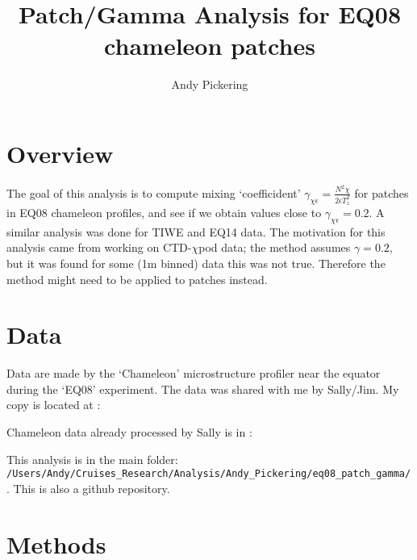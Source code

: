 \documentclass[11pt]{article}
\title{Patch/Gamma Analysis for EQ08 chameleon patches}
\author{Andy Pickering}
\begin{document}
\maketitle

\tableofcontents
\newpage

\section{Overview}

The goal of this analysis is to compute mixing `coefficident' $\gamma_{\chi\epsilon}=\frac{N^2 \chi}{2\epsilon T_{z}^{2}} $ for patches in EQ08 chameleon profiles, and see if we obtain values close to $\gamma_{\chi\epsilon}=0.2$. A similar analysis was done for TIWE and EQ14 data. The motivation for this analysis came from working on CTD-$\chi$pod data; the method assumes $\gamma=0.2$, but it was found for some (1m binned) data this was not true. Therefore the method might need to be applied to patches instead.

\section{Data}

Data are made by the `Chameleon' microstructure profiler near the equator during the `EQ08' experiment. The data was shared with me by Sally/Jim. My copy is located at : 
\medskip
\newline
\medskip

Chameleon data already processed by Sally is in : \newline

\medskip

This analysis is in the main folder: \newline  \verb+/Users/Andy/Cruises_Research/Analysis/Andy_Pickering/eq08_patch_gamma/+ . This is also a github repository.






\section{Methods}
\end{document}
